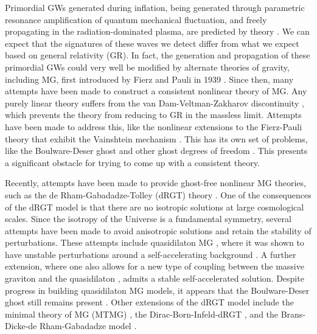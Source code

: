 \documentclass[prd,twocolumn,aps,psfig,nofootinbib,nobibnotes,superscriptaddress,preprintnumbers,times]{revtex4-2}
\begin{document}
Primordial GWs generated during inflation, being generated through parametric resonance amplification of quantum mechanical fluctuation, and freely propagating in the radiation-dominated plasma, are predicted by theory 
\cite{Grishchuk:1976,Grishchuk:1977zz,Starobinsky:1980te,Linde:1981mu,Fabbri:1983us}. We can expect that the signatures of these waves we detect differ from what we expect based on general relativity (GR). In fact, the generation and propagation of these primordial GWs could very well be modified by alternate theories of gravity, including MG, first introduced by Fierz and Pauli in 1939 \cite{Fierz:1939ix}. Since then, many attempts have been made to construct a consistent nonlinear theory of MG. Any purely linear theory suffers from the van Dam-Veltman-Zakharov discontinuity \cite{vanDam:1970vg,Zakharov:1970cc}, which prevents the theory from reducing to GR in the massless limit. Attempts have been made to address this, like the nonlinear extensions to the Fierz-Pauli theory that exhibit the Vainshtein mechanism \cite{Vainshtein:1972sx}. This has its own set of problems, like the Boulware-Deser ghost and other ghost degrees of freedom \cite{Boulware:1972yco,Dubovsky:2004sg}. This presents a significant obstacle for trying to come up with a consistent theory.

Recently, attempts have been made to provide ghost-free nonlinear MG  theories, such as the de Rham-Gabadadze-Tolley (dRGT) theory \cite{Hassan:2011tf, Hassan:2011ea, deRham:2010ik,deRham:2010kj}. One of the consequences of the dRGT model is that there are no isotropic solutions at large cosmological scales. Since the isotropy of the Universe is a fundamental symmetry, several attempts have been made to avoid anisotropic solutions and retain the stability of perturbations. These attempts include quasidilaton MG \cite{DAmico:2012hia}, where it was shown to have unstable perturbations around a self-accelerating background \cite{Gumrukcuoglu:2013nza}. A further extension, where one also allows for a new type of coupling between the massive graviton and the quasidilaton \cite{DeFelice:2013tsa}, admits a stable self-accelerated solution. Despite progress in building quasidilaton MG models, it appears that the Boulware-Deser ghost still remains present \cite{Mukohyama:2013raa}. Other extensions of the dRGT model include the minimal theory of MG (MTMG) \cite{DeFelice:2015hla,DeFelice:2015moy}, the Dirac-Born-Infeld-dRGT \cite{Kazempour:2022giy}, and the Brans-Dicke-de Rham-Gabadadze model \cite{Kazempour:2022let}.
\end{document}
